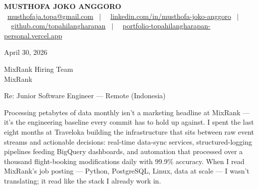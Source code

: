 \documentclass[11pt,a4paper]{article}
\newcommand{\contactline}[1]{\small #1}
\begin{document}
\begin{center}
    {\LARGE \textbf{MUSTHOFA JOKO ANGGORO}} \\[4pt]
    \contactline{
        \faEnvelope\ \href{mailto:musthofaja.topa@gmail.com}{musthofaja.topa@gmail.com} \ $|$ \ 
        \faLinkedin\ \href{https://www.linkedin.com/in/musthofa-joko-anggoro/}{linkedin.com/in/musthofa-joko-anggoro} \ $|$ \
        \faGithub\ \href{https://github.com/topahilangharapan}{github.com/topahilangharapan} \ $|$ \
        \faGlobe\ \href{https://portfolio-topahilangharapan-personal.vercel.app/}{portfolio-topahilangharapan-personal.vercel.app}
    }
\end{center}

\vspace{12pt}

April 30, 2026

\vspace{8pt}

MixRank Hiring Team \\
MixRank

\vspace{12pt}

Re: Junior Software Engineer — Remote (Indonesia)

\vspace{12pt}


Processing petabytes of data monthly isn't a marketing headline at MixRank — it's the engineering baseline every commit has to hold up against. I spent the last eight months at Traveloka building the infrastructure that sits between raw event streams and actionable decisions: real-time data-sync services, structured-logging pipelines feeding BigQuery dashboards, and automation that processed over a thousand flight-booking modifications daily with 99.9\% accuracy. When I read MixRank's job posting — Python, PostgreSQL, Linux, data at scale — I wasn't translating; it read like the stack I already work in.

\vspace{6pt}
\end{document}
